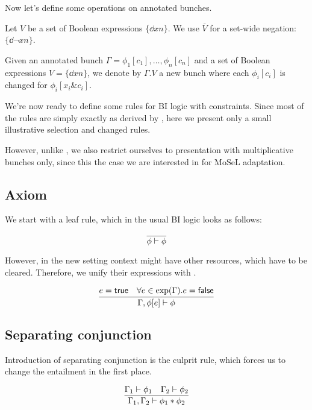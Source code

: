 Now let's define some operations on annotated bunches.

\begin{definition}
  Let \(V\) be a set of Boolean expressions \(\{\dd {x} {n}\}\).
  We use \(\overline{V}\) for a set-wide negation: \(\{\dd {\neg {x}} {n}\}\).
\end{definition}

\begin{definition}
  Given an annotated bunch \(\Gamma = \phi_1[c_1],\ldots,\phi_n[c_n]\) and a set of Boolean expressions \(V = \{\dd {x} {n}\}\), we denote by \(\Gamma . V\) a new bunch where each \(\phi_i[c_i]\) is changed for \(\phi_i[x_i \& c_i]\).
\end{definition}

We're now ready to define some rules for BI logic with constraints.
Since most of the rules are simply exactly as derived by \citet{harlandResourceDistributionBooleanConstraints2003}, here we present only a small illustrative selection and changed rules.

However, unlike \citet{harlandResourceDistributionBooleanConstraints2003}, we also restrict ourselves to presentation with multiplicative bunches only, since this the case we are interested in for MoSeL adaptation.

\subsection{Axiom}

We start with a leaf rule, which in the usual BI logic looks as follows:

\[\infer{\phi \vdash \phi}{}\]

However, in the new setting context might have other resources, which have to be cleared.
Therefore, we unify their expressions with \false.

\[\infer{\Gamma, \phi[e] \vdash \phi}
      {e = \true &
       \forall e \in \expr(\Gamma). e = \false}\]


\subsection{Separating conjunction}

Introduction of separating conjunction is the culprit rule, which forces us to change the entailment in the first place.

\[\infer{\Gamma_1, \Gamma_2 \vdash \phi_1 \ast \phi_2}
        {\Gamma_1 \vdash \phi_1 &
         \Gamma_2 \vdash \phi_2}\]

